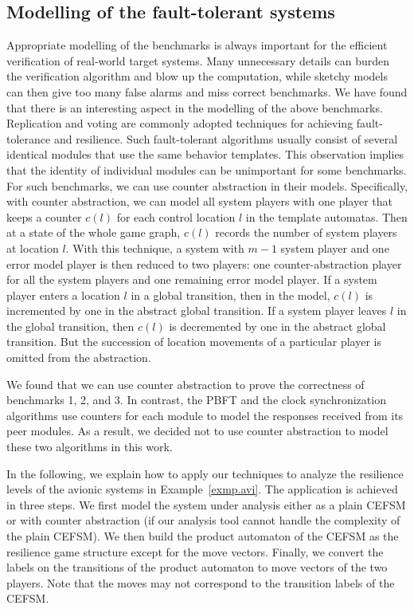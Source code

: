 \subsection{Modelling of the fault-tolerant systems}
Appropriate modelling of the benchmarks is always important for 
the efficient verification of real-world target systems. 
Many unnecessary details can burden the verification algorithm 
and blow up the computation, 
while sketchy models can then give too many false alarms 
and miss correct benchmarks.  
We have found that there is an interesting aspect 
in the modelling of the above benchmarks.  
Replication and voting are commonly adopted techniques for 
achieving fault-tolerance and resilience.  
Such fault-tolerant algorithms usually consist of 
several identical modules that use the same behavior templates.  
This observation implies that the identity of individual modules 
can be unimportant for some benchmarks.  
For such benchmarks, we can use counter abstraction 
\cite{ET99,Lubachevsky84} in their models.  
Specifically, with counter abstraction, 
we can model all system players with one player that keeps a counter $c(l)$ 
for each control location $l$ in the template automatas. 
Then at a state of the whole game graph, 
$c(l)$ records the number of system players at location $l$.  
With this technique, a system with $m-1$ system player and one error model player is 
then reduced to two players: one counter-abstraction player for all the system players and one 
remaining error model player. 
If a system player enters a location $l$ in a global transition, 
then in the model, $c(l)$ is incremented by one in the abstract global transition. 
If a system player leaves $l$ in the global transition, 
then $c(l)$ is decremented by one in the abstract global transition.  
But the succession of location movements of a particular player is omitted from the abstraction. 
 

We found that we can use counter abstraction to 
prove the correctness of benchmarks 1, 2, and 3. 
In contrast, the PBFT and the clock synchronization algorithms use 
counters for each module to model the responses received 
from its peer modules. 
As a result, we decided not to use counter abstraction to model 
these two algorithms in this work. 

In the following, we explain how to apply our techniques to analyze 
the resilience levels of the avionic systems 
in Example~\ref{exmp.avi}.  
The application is achieved in three steps.
We first model the system under analysis either as a plain CEFSM or with counter abstraction (if our analysis tool cannot handle the complexity of the plain CEFSM).
We then build the product automaton of the CEFSM as the resilience 
game structure except for the move vectors.  
Finally, we convert the labels on the transitions of the product automaton to 
move vectors of the two players. 
Note that the moves may not correspond to the transition labels of the CEFSM.  

